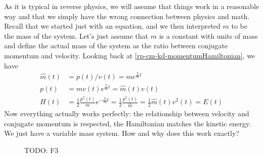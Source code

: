 As it is typical in reverse physics, we will assume that things work in a reasonable way and that we simply have the wrong connection between physics and math. Recall that we started just with an equation, and we then interpreted $m$ to be the mass of the system. Let's just assume that $m$ is a constant with units of mass and define the actual mass of the system as the ratio between conjugate momentum and velocity. Looking back at \ref{rp-cm-kd-momentumHamiltonian}, we have 
\begin{equation}
	\begin{aligned}
	\hat{m}(t) &= p(t) / v(t) = m e^{\frac{b}{m}t} \\
	p(t) &= mv(t)e^{\frac{b}{m}t} = \hat{m}(t) v(t) \\
	H(t) &= \frac{1}{2} \frac{p^2(t)}{m}  e^{-\frac{b}{m}t} = \frac{1}{2} \frac{p^2(t)}{\hat{m}} = \frac{1}{2} \hat{m}(t) v^2(t) = E(t)
	\end{aligned}
\end{equation}
Now everything actually works perfectly: the relationship between velocity and conjugate momentum is respected, the Hamiltonian matches the kinetic energy. We just have a variable mass system. How and why does this work exactly?

\begin{figure}
	\centering
	\begin{tikzpicture}
	\end{tikzpicture}
	\caption {TODO: F3}
\end{figure}

